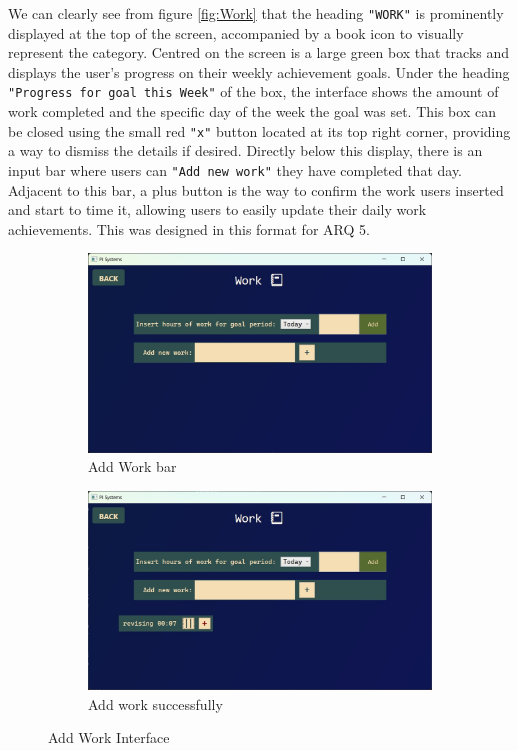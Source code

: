 \documentclass[11pt]{article}
\begin{document}
We can clearly see from figure \ref{fig:Work} that the heading \texttt{"WORK"} is
prominently displayed at the top of the screen, accompanied by a book icon to
visually represent the category. Centred on the screen is a large green box that
tracks and displays the user's progress on their weekly achievement goals. Under
the heading \texttt{"Progress for goal this Week"} of the box, the interface
shows the amount of work completed and the specific day of the week the goal was
set. This box can be closed using the small red \texttt{"x"} button located at
its top right corner, providing a way to dismiss the details if desired. Directly
below this display, there is an input bar where users can \texttt{"Add new work"}
they have completed that day. Adjacent to this bar, a plus button is the way to
confirm the work users inserted and start to time it, allowing users to easily
update their daily work achievements. This was designed in this format for ARQ 5.\par

\begin{figure}[!ht]
  \centering
  \begin{subfigure}{0.4\linewidth}
    \includegraphics[width=\linewidth]{Add Work}
    \caption{Add Work bar}
    \label{fig:Add_Work}
  \end{subfigure}
  \hfill
  \begin{subfigure}{0.4\linewidth}
    \includegraphics[width=\linewidth]{Add Work 2}
    \caption{Add work successfully}
    \label{fig:Add_Work_2}
  \end{subfigure}
  \caption{Add Work Interface}
  \label{fig:Work_Interface}
\end{figure}
\end{document}
